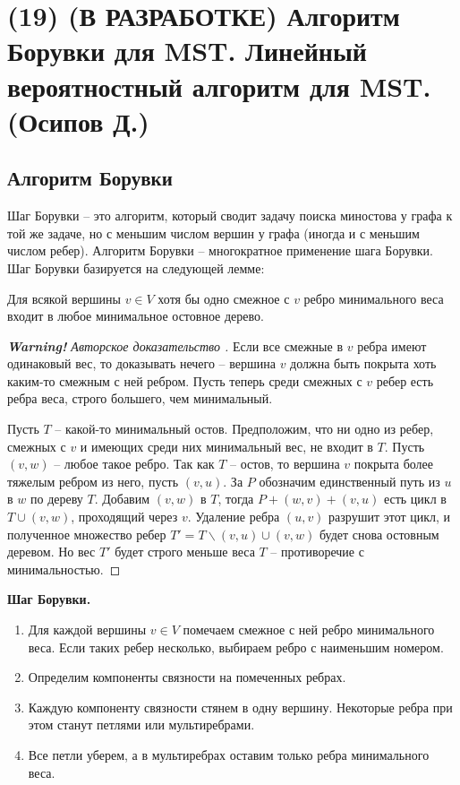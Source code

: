 \section{(19) (В РАЗРАБОТКЕ) Алгоритм Борувки для MST. Линейный вероятностный алгоритм для MST. (Осипов Д.)}

\newcommand{\achtung}{\color{red}\textbf{Warning!} Авторское доказательство }

\subsection{Алгоритм Борувки}
Шаг Борувки -- это алгоритм, который сводит задачу поиска миностова у графа к той же задаче, но с меньшим числом вершин у графа (иногда и с меньшим числом ребер). Алгоритм Борувки -- многократное применение шага Борувки. Шаг Борувки базируется на следующей лемме:

\begin{lemma*} Для всякой вершины $v \in V$ хотя бы одно смежное с $v$ ребро минимального веса входит в любое минимальное остовное дерево. \end{lemma*}
\begin{proof}[\achtung]
Если все смежные в $v$ ребра имеют одинаковый вес, то доказывать нечего -- вершина $v$ должна быть покрыта хоть каким-то смежным с ней ребром. Пусть теперь среди смежных с $v$ ребер есть ребра веса, строго большего, чем минимальный.

Пусть $T$ -- какой-то минимальный остов. Предположим, что ни одно из ребер, смежных с $v$ и имеющих среди них минимальный вес, не входит в $T$. Пусть $(v, w)$ -- любое такое ребро. Так как $T$ -- остов, то вершина $v$ покрыта более тяжелым ребром из него, пусть $(v, u)$. За $P$ обозначим единственный путь из $u$ в $w$ по дереву $T$. Добавим $(v, w)$ в $T$, тогда $P + (w, v) + (v, u)$ есть цикл в $T\cup(v, w)$, проходящий через $v$. Удаление ребра $(u, v)$ разрушит этот цикл, и полученное множество ребер $T' = T\smallsetminus (v, u) \cup (v, w)$ будет снова остовным деревом. Но вес $T'$ будет строго меньше веса $T$ -- противоречие с минимальностью.
\end{proof}

\textbf{Шаг Борувки.} 
\begin{enumerate}
    \item Для каждой вершины $v \in V$ помечаем смежное с ней ребро минимального веса. Если таких ребер несколько, выбираем ребро с наименьшим номером.
    \item Определим компоненты связности на помеченных ребрах.
    \item Каждую компоненту связности стянем в одну вершину. Некоторые ребра при этом станут петлями или мультиребрами.
    \item Все петли уберем, а в мультиребрах оставим только ребра минимального веса.
\end{enumerate}

